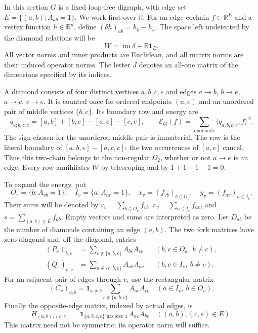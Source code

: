 \documentclass[11pt]{article}
\theoremstyle{remark}
\newcommand{\R}{\mathbb R}
\newcommand{\one}{\mathbf 1}
\newcommand{\ip}[2]{\langle#1,#2\rangle}
\newcommand{\im}{\operatorname{im}}
\begin{document}
In this section $G$ is a fixed loop-free digraph, with edge set
$E=\{(a,b):A_{ab}=1\}$. We work first over $\R$.
For an edge cochain $f\in\R^E$ and a vertex function $h\in\R^n$, define
$(\delta h)_{ab}=h_b-h_a$. The space left undetected by the diamond
relations will be
\begin{equation}\label{eq:W}
 W=\im\delta+\R\one_E.
\end{equation}
All vector norms and inner products are Euclidean, and all matrix norms
are their induced operator norms. The letter $J$ denotes an all-one matrix
of the dimensions specified by its indices.

A diamond consists of four distinct vertices $a,b,c,e$ and edges
$a\to b$, $b\to e$, $a\to c$, $c\to e$. It is counted once for ordered
endpoints $(a,e)$ and an unordered pair of middle vertices $\{b,c\}$.
Its boundary row and energy are
\[
 q_{a;b,c;e}=[a,b]+[b,e]-[a,c]-[c,e],\qquad
 \mathcal E_G(f)=\sum_{\text{diamonds}}\ip{q_{a;b,c;e}}{f}^{\,2}.
\]
The sign chosen for the unordered middle pair is immaterial.
The row is the literal boundary of $[a,b,e]-[a,c,e]$:
the two occurrences of $[a,e]$ cancel. Thus this two-chain belongs to
the non-regular $\Omega_2$, whether or not $a\to e$ is an edge.
Every row annihilates $W$ by telescoping and by $1+1-1-1=0$.

To expand the energy, put
\[
 O_v=\{b:A_{vb}=1\},\quad I_v=\{a:A_{av}=1\},\quad
 x_v=(f_{vb})_{b\in O_v},\quad y_v=(f_{av})_{a\in I_v}.
\]
Their sums will be denoted by
$r_v=\sum_{b\in O_v}f_{vb}$, $c_v=\sum_{a\in I_v}f_{av}$,
and $s=\sum_{(a,b)\in E}f_{ab}$. Empty vectors and sums are interpreted
as zero. Let $D_{ab}$ be the number of diamonds containing an edge $(a,b)$.
The two fork matrices have zero diagonal and, off the diagonal, entries
\begin{align}
 (P_a)_{b,c}&=\sum_{e\notin\{a,b,c\}}A_{be}A_{ce}
       &&(b,c\in O_a,\ b\ne c),\label{eq:P}\\
 (Q_e)_{b,c}&=\sum_{a\notin\{e,b,c\}}A_{ab}A_{ac}
       &&(b,c\in I_e,\ b\ne c).\label{eq:Q}
\end{align}
For an adjacent pair of edges through $v$, use the rectangular matrix
\begin{equation}\label{eq:C}
 (C_v)_{a,b}=\one_{a\ne b}
       \sum_{c\notin\{a,b,v\}}A_{ac}A_{cb}
       \quad(a\in I_v,\ b\in O_v).
\end{equation}
Finally the opposite-edge matrix, indexed by actual edges, is
\begin{equation}\label{eq:H}
 H_{(a,b),(c,e)}=
 \one_{\{a,b,c,e\}\text{ has size }4}\,A_{ac}A_{be}
       \quad((a,b),(c,e)\in E).
\end{equation}
This matrix need not be symmetric; its operator norm will suffice.
\end{document}
